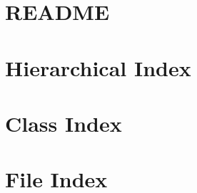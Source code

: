\documentclass[twoside]{book}
\newcommand{\+}{\discretionary{\mbox{\scriptsize$\hookleftarrow$}}{}{}}
\begin{document}
\chapter{R\+E\+A\+D\+ME}
\label{md__utilities__output_utility__r_e_a_d_m_e}

\chapter{Hierarchical Index}

\chapter{Class Index}

\chapter{File Index}

\end{document}
